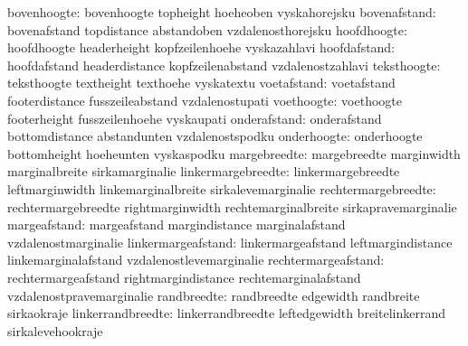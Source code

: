                   bovenhoogte:  bovenhoogte                  topheight
                                hoeheoben                    vyskahorejsku
                 bovenafstand:  bovenafstand                 topdistance
                                abstandoben                  vzdalenosthorejsku
                  hoofdhoogte:  hoofdhoogte                  headerheight
                                kopfzeilenhoehe              vyskazahlavi
                 hoofdafstand:  hoofdafstand                 headerdistance
                                kopfzeilenabstand            vzdalenostzahlavi
                  teksthoogte:  teksthoogte                  textheight
                                texthoehe                    vyskatextu
                  voetafstand:  voetafstand                  footerdistance
                                fusszeileabstand             vzdalenostupati
                   voethoogte:  voethoogte                   footerheight
                                fusszeilenhoehe              vyskaupati
                 onderafstand:  onderafstand                 bottomdistance
                                abstandunten                 vzdalenostspodku
                  onderhoogte:  onderhoogte                  bottomheight
                                hoeheunten                   vyskaspodku
                 margebreedte:  margebreedte                 marginwidth
                                marginalbreite               sirkamarginalie
           linkermargebreedte:  linkermargebreedte           leftmarginwidth
                                linkemarginalbreite          sirkalevemarginalie
          rechtermargebreedte:  rechtermargebreedte          rightmarginwidth
                                rechtemarginalbreite         sirkapravemarginalie
                 margeafstand:  margeafstand                 margindistance
                                marginalafstand              vzdalenostmarginalie
           linkermargeafstand:  linkermargeafstand           leftmargindistance
                                linkemarginalafstand         vzdalenostlevemarginalie
          rechtermargeafstand:  rechtermargeafstand          rightmargindistance
                                rechtemarginalafstand        vzdalenostpravemarginalie
                  randbreedte:  randbreedte                  edgewidth
                                randbreite                   sirkaokraje
            linkerrandbreedte:  linkerrandbreedte            leftedgewidth
                                breitelinkerrand             sirkalevehookraje
